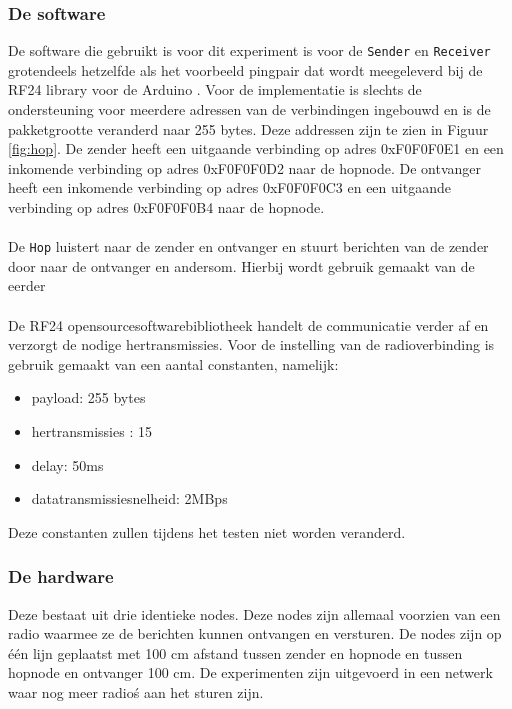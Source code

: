 \documentclass{article}
\begin{document}
\subsubsection{De software}

De software die gebruikt is voor dit experiment is voor de 
\texttt{Sender} en \texttt{Receiver} grotendeels hetzelfde als het voorbeeld pingpair dat wordt meegeleverd bij de RF24 library voor de Arduino \cite{rf24}. Voor de implementatie is slechts de ondersteuning voor meerdere adressen van de verbindingen ingebouwd en is de pakketgrootte veranderd naar 255 bytes. Deze addressen zijn te zien in Figuur \ref{fig:hop}. De zender heeft een uitgaande verbinding op adres 0xF0F0F0E1 en een inkomende verbinding op adres 0xF0F0F0D2 naar de hopnode. De ontvanger heeft een inkomende verbinding op adres 0xF0F0F0C3 en een uitgaande verbinding op adres 0xF0F0F0B4 naar de hopnode.\\
\\
De \texttt{Hop} luistert naar de zender en ontvanger en stuurt berichten van de zender door naar de ontvanger en andersom. Hierbij wordt gebruik gemaakt van de eerder \\
\\
De RF24 opensourcesoftwarebibliotheek handelt de communicatie verder af en verzorgt de nodige hertransmissies. Voor de instelling van de radioverbinding is gebruik gemaakt van een aantal constanten, namelijk:

\begin{itemize}
	\item payload: 255 bytes
	\item hertransmissies : 15
	\item delay: 50ms
	\item datatransmissiesnelheid: 2MBps
\end{itemize}  
Deze constanten zullen tijdens het testen niet worden veranderd.

\subsubsection{De hardware}

Deze bestaat uit drie identieke nodes. Deze nodes zijn allemaal voorzien van een radio waarmee ze de berichten kunnen ontvangen en versturen. De nodes zijn op \'e\'en lijn geplaatst met 100 cm afstand tussen zender en hopnode en tussen hopnode en ontvanger 100 cm. De experimenten zijn uitgevoerd in een netwerk waar nog meer radio\'s aan het sturen zijn.
 
\end{document}
